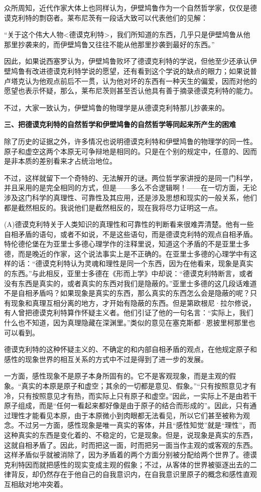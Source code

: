 \documentclass[a4paper,twoside,12pt]{ctexart}
\begin{document}
众所周知，近代作家大体上也同样认为，伊壁鸠鲁作为一个自然哲学家，仅仅是德谟克利特的剽窃者。莱布尼茨有一段话大致可以代表他们的见解：

“关于这个伟大人物<德谟克利特>，我们所知道的东西，几乎只是伊壁鸠鲁从他那里抄袭来的，而伊壁鸠鲁又往往不能从他那里抄袭到最好的东西。”

因此，如果说西塞罗认为，伊壁鸠鲁败坏了德谟克利特的学说，但他至少还承认伊壁鸠鲁有改进德谟克利特学说的愿望，还有看到这个学说的缺点的眼力；如果说普卢塔克认为他观点前后不一贯，认为他对坏的东西有一种天生的偏爱，因而对他的愿望也表示怀疑，那么，莱布尼茨则甚至否认他具有善于摘录德谟克利特的能力。

不过，大家一致认为，伊壁鸠鲁的物理学是从德谟克利特那儿抄袭来的。

\textbf{三、把德谟克利特的自然哲学和伊壁鸠鲁的自然哲学等同起来所产生的困难}

除了历史的证据之外，许多情况也说明德谟克利特和伊壁鸠鲁的物理学的同一性。原子和虚空这两个本原无可争辩地是相同的。只是在个别的规定中，任意的、因而是非本质的差别看来才占统治地位。

不过，这样就留下一个奇特的、无法解开的谜。两位哲学家讲授的是同一门科学，并且采用的是完全相同的方式，但是——多么不合逻辑啊！——在一切方面，无论涉及这门科学的真理性、可靠性及其应用，还是涉及思想和现实的一般关系，他们都是截然相反的。我说他们是截然相反的，现在我将尽力证明这一点。

 (A)德谟克利特关于人类知识的真理性和可靠性的判断看来很难弄清楚。他有一些自相矛盾的语句，或者不如说，不是这些语句，而是德谟克利特的观点自相矛盾。特伦德伦堡在为亚里士多德心理学作的注释里说，知道这个矛盾的不是亚里士多德，而是晚近的作家，这个说法事实上是不正确的。在亚里士多德的心理学中有这样的话：“德谟克利特认为灵魂和理性是同一个东西，因为在他看来，现象是真实的东西。”与此相反，亚里士多德在《形而上学》中却说：“德谟克利特断言，或者没有东西是真实的，或者真实的东西对我们是隐蔽的。”亚里士多德的这几段话难道不是自相矛盾吗？如果现象是真实的东西，那么真实的东西怎么会是隐蔽的呢？只有现象和真理互相分离的地方，才开始有隐蔽的东西。但是第欧根尼·拉尔修说，有人曾把德谟克利特算作怀疑主义者。他们引证了他的一句名言：“实际上，我们什么也不知道，因为真理隐藏在深渊里。”类似的意见在塞克斯都·恩披里柯那里也可以看到。

德谟克利特的这种怀疑主义的、不确定的和内部自相矛盾的观点，在他规定原子和感性的现象世界的相互关系的方式中不过是得到了进一步的发展。

一方面，感性现象不是原子本身所固有的。它不是客观现象，而是主观的假象。“真实的本原是原子和虚空；其余的一切都是意见、假象。”“只有按照意见才有冷，只有按照意见才有热，而实际上只有原子和虚空。”因此，一实际上不是由若干原子组成，而是“任何一看起来都好像是由于原子的结合而形成的”。因此，只有通过理性才能看见本原，由于本原微小到肉眼都无法看见，所以它们甚至被称为观念。不过另一方面，感性现象是唯一真实的客体，并且“感性知觉”就是“理性”，而这种真实的东西是变化着的、不稳定的，它是现象。但是，说现象是真实的东西，这就自相矛盾了。因此，时而把这一面，时而把另一面当作主观的或客观的东西。这样矛盾似乎就被消除了，因为矛盾着的两个方面分别被分配给两个世界了。德谟克利特因而就把感性的现实变成主观的假象；不过，从客体的世界被驱逐出去的二律背反，却仍然存在于他自己的自我意识内，在自我意识里原子的概念和感性直观互相敌对地冲突着。
\end{document}
